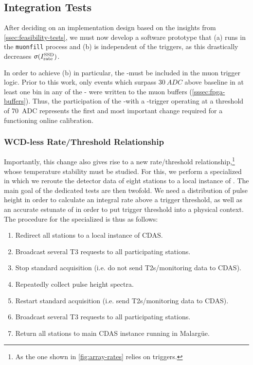 \subsection{Integration Tests}
\label{ssec:integration-tests}

After deciding on an implementation design based on the insights from
\cref{ssec:feasibility-tests}, we must now develop a software prototype
that (a) runs in the \texttt{muonfill} process and (b) is independent of the
\WCD triggers, as this drastically decreases $\upsigma(I^\text{SSD}_\text{rate})$. 

In order to achieve (b) in particular, the \SSD-\PMT must be included in the 
muon trigger logic. Prior to this work, only events which surpass 
$\SI{30}{ADC}$ above baseline in at least one bin in any of the \WCD-\LPMTs 
were written to the muon buffers (\cref{sssec:fpga-buffers}). Thus, the 
participation of the \SSD-\PMT with a \SB-trigger operating at a threshold of 
\SI{70}{ADC} represents the first and most important change required for a 
functioning \SSD online calibration.

\subsubsection{WCD-less Rate/Threshold Relationship}

Importantly, this change also gives rise to a new rate/threshold 
relationship,\footnote{As the one shown in \cref{fig:array-rates} relies on 
\WCD triggers.} whose temperature stability must be studied. For this, we 
perform a specialized \DAQ in which we reroute the detector data of eight
 stations to a local instance of \CDAS. The main goal of the dedicated 
tests are then twofold. We need a distribution of \SSD pulse height in order 
to calculate an integral rate above a trigger threshold, as well as an 
accurate estunate of \Imip in order to put trigger threshold into a physical
context. The procedure for the specialized \DAQ is thus as follows:

\begin{enumerate}
\item Redirect all stations to a local instance of CDAS.
\item Broadcast several T3 requests to all participating stations.
\item Stop standard acquisition (i.e. do not send T2s/monitoring data to CDAS).
\item Repeatedly collect \SSD pulse height spectra.
\item Restart standard acquisition (i.e. send T2s/monitoring data to CDAS).
\item Broadcast several T3 requests to all participating stations.
\item Return all stations to main CDAS instance running in Malargüe.
\end{enumerate}

